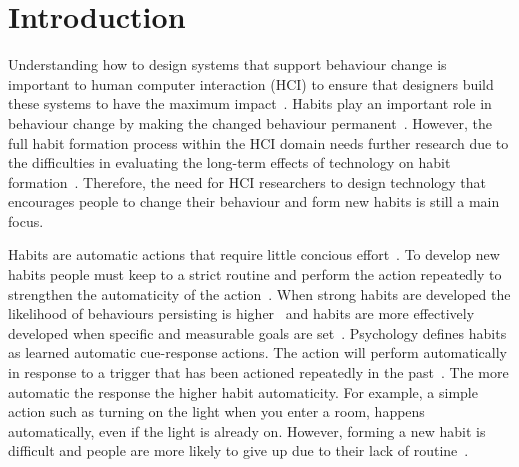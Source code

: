 
\section{Introduction}

Understanding how to design systems that support behaviour change is important to human computer interaction (HCI) to ensure that designers build these systems to have the maximum impact~\cite{how_to_evaluate_tech_for_behaviour_change}. Habits play an important role in behaviour change by making the changed behaviour permanent~\cite{article_promoting_habit_formation}. However, the full habit formation process within the HCI domain needs further research due to the difficulties in evaluating the long-term effects of technology on habit formation~\cite{article_evaluate_tech_health_behaviour_change}. Therefore, the need for HCI researchers to design technology that encourages people to change their behaviour and form new habits is still a main focus.

Habits are automatic actions that require little concious effort~\cite{article_the_habitual_consumer}. To develop new habits people must keep to a strict routine and perform the action repeatedly to strengthen the automaticity of the action~\cite{article_promoting_habit_formation}. When strong habits are developed the likelihood of behaviours persisting is higher~\cite{putting_habit_into_practice} and habits are more effectively developed when specific and measurable goals are set~\cite{habits_better_when_have_specific_and_measurable_goals}. Psychology defines habits as learned automatic cue-response actions. The action will perform automatically in response to a trigger that has been actioned repeatedly in the past~\cite{article_the_habitual_consumer}. The more automatic the response the higher habit automaticity. For example, a simple action such as turning on the light when you enter a room, happens automatically, even if the light is already on. However, forming a new habit is difficult and people are more likely to give up due to their lack of routine~\cite{article_promoting_habit_formation, article_the_habitual_consumer}.

